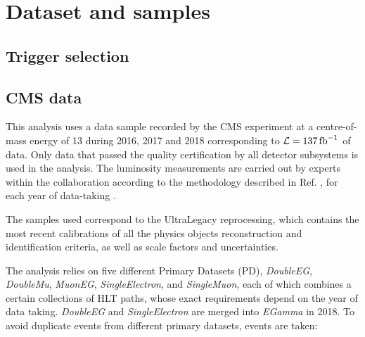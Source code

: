 \section{Dataset and samples}
\label{sec:datasets}

\subsection{Trigger selection}


\subsection{CMS data}
This analysis uses a data sample recorded by the CMS experiment at a centre-of-mass energy of 13 \TeV during 2016, 2017 and 2018 corresponding to $\mathcal{L} = 137 \mbox{\ensuremath{\,\text{fb}^{-1}}}$ of data.
Only data that passed the quality certification by all detector subsystems is used in the analysis.
The luminosity measurements are carried out by experts within the collaboration according to the methodology described in Ref. \cite{CMS:LUM-17-003}, for each year of data-taking \cite{CMS:LUM-17-004, CMS:LUM-18-002}.

The samples used correspond to the UltraLegacy reprocessing, which contains the most recent calibrations of all the physics objects reconstruction and identification criteria, as well as scale factors and uncertainties.

The analysis relies on five different Primary Datasets (PD),
{\it DoubleEG}, {\it DoubleMu}, {\it MuonEG}, {\it SingleElectron}, and {\it SingleMuon},
each of which combines a certain collections of HLT paths, whose exact requirements depend on the year of data
taking. {\it DoubleEG} and {\it SingleElectron} are merged into {\it EGamma} in 2018.
To avoid duplicate events from different primary datasets, events are taken:

